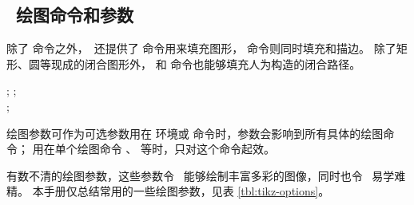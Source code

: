 \subsection{\TikZ\ 绘图命令和参数}\label{subsec:tikz-draw}

除了  命令之外，\TikZ\ 还提供了  命令用来填充图形， 命令则同时填充和描边。
除了矩形、圆等现成的闭合图形外， 和  命令也能够填充人为构造的闭合路径。
\begin{command}
\oarg*{\ldots} ; \quad
{}\oarg*{\ldots} ; \\
\oarg*{\ldots} ; 
\end{command}

绘图参数可作为可选参数用在  环境或  命令时，参数会影响到所有具体的绘图命令；
用在单个绘图命令 、 等时，只对这个命令起效。

\TikZ 有数不清的绘图参数，这些参数令 \TikZ\ 能够绘制丰富多彩的图像，同时也令 \TikZ\ 易学难精。
本手册仅总结常用的一些绘图参数，见表 \ref{tbl:tikz-options}。

